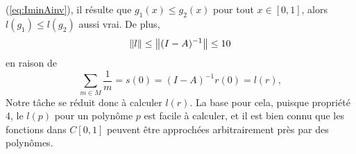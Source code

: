 (\ref{eq:IminAinv}), il r\'esulte que $g_{1}(x) \le g_{2}(x)$ pour tout $x \in
[0, 1]$, alors $l(g_{1}) \le l(g_{2})$ aussi vrai. De plus,
\begin{equation}
	\left\lVert l\right\rVert \le \left\lVert(I-A)^{-1}\right\rVert \le 10 
	\label{eq:norml}
\end{equation}
en raison de
\[
	\sum_{m\in M} \frac{1}{m} = s(0) = (I-A)^{-1} r(0) = l(r),
\]
Notre t\^{a}che se r\'eduit donc \`a calculer $l(r)$. La base pour cela, puisque
propri\'et\'e 4, le $l(p)$ pour un polyn\^{o}me $p$ est facile \`a
calculer, et il est bien connu que les fonctions dans $C[0,1]$ peuvent \^{e}tre
approch\'ees arbitrairement pr\`es par des polyn\^{o}mes.

